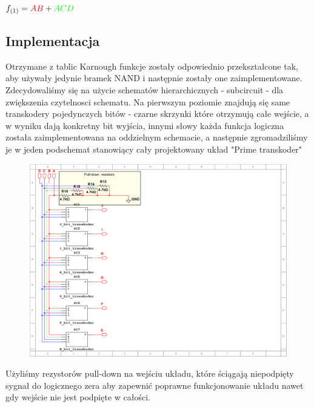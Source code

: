 \documentclass[a4paper]{article}
\begin{document}
  \begin{center}
  $f_{(1)} = \textcolor{red}{AB} + \textcolor{green}{ACD}$
\end{center}

\subsection{Implementacja}
Otrzymane z tablic Karnough funkcje zostały odpowiednio przekształcone tak,
 aby używały jedynie bramek NAND i następnie zostały one zaimplementowane. Zdecydowaliśmy się 
 na użycie schematów hierarchicznych - subcircuit - dla zwiększenia czytelnosci schematu. 
 Na pierwszym poziomie znajdują się same transkodery pojedynczych bitów - czarne skrzynki które otrzymują 
 całe wejście, a w wyniku dają konkretny bit wyjścia, innymi słowy każda funkcja logiczna została zaimplementowana
 na oddzielnym schemacie, a następnie zgromadziliśmy je w jeden podschemat stanowiący cały projektowany układ "Prime transkoder"
\begin{figure}[H]
  \centering
  \includegraphics[width=\textwidth]{prime_transkoder.png}
  \label{Podschemat najwyższego rzędu, gromadzący w sobie podschematy właściwych funkcji logicznych}
\end{figure}

Użyliśmy rezystorów pull-down na wejściu układu, które ściągają niepodpięty sygnał do logicznego zera aby 
zapewnić poprawne funkcjonowanie układu nawet gdy wejście nie jest podpięte w całości.
\end{document}
